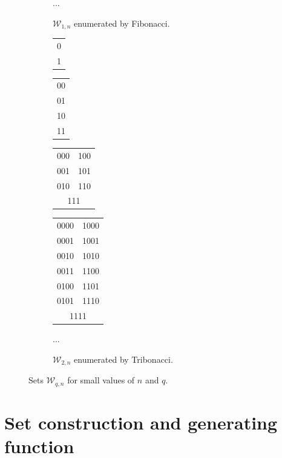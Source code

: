 \documentclass[a4paper,12pt]{article}
\theoremstyle{definition}
\newcommand{\W}{\mathcal{W}}
\begin{document}
\begin{figure}[ht]
\begin{subfigure}[b]{0.43\textwidth}
          {\Huge ...}
    \caption{$\W_{1,n}$ enumerated by Fibonacci.}\label{ex1}
  \end{subfigure}
  \quad
  \begin{subfigure}[b]{0.45\textwidth}
      \begin{tabular}{c}
        0 \\
        1
      \end{tabular}
      \begin{tabular}{c}
        00 \\
        01 \\
        10 \\
        11
      \end{tabular}
      {\setlength{\tabcolsep}{5pt}
      \begin{tabular}{cc}
        000 & 100\\
        001 & 101 \\
        010 & 110 \\
        \multicolumn{2}{c}{111}
      \end{tabular}
      \begin{tabular}{cc}
        0000 & 1000 \\
        0001 & 1001 \\
        0010 & 1010 \\
        0011 & 1100 \\
        0100 & 1101 \\
        0101 & 1110 \\
        \multicolumn{2}{c}{1111} \\
      \end{tabular}
      }
      {\Huge ...}
    \caption{$\W_{2,n}$ enumerated by Tribonacci.}\label{ex2}
  \end{subfigure}
  \caption{Sets $\W_{q,n}$ for small values of $n$ and $q$.}
  \label{ex}
\end{figure}

\section{Set construction and generating function}
\end{document}
